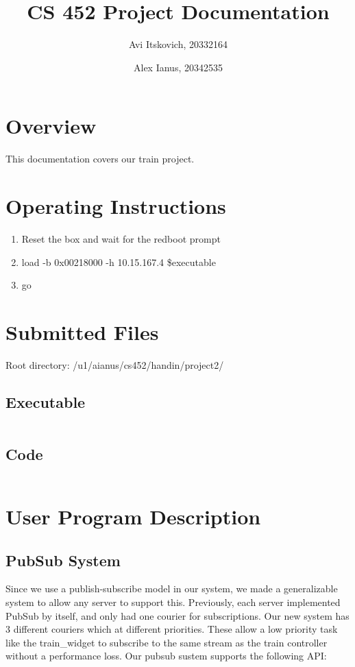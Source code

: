 \documentclass{article}
\title{CS 452 Project Documentation}
\author{
  Avi Itskovich, 20332164
  \and
  Alex Ianus, 20342535
}
\begin{document}
\maketitle

\section{Overview}

This documentation covers our train project.

\section{Operating Instructions}
\begin{enumerate}
  \item Reset the box and wait for the redboot prompt
  \item load -b 0x00218000 -h 10.15.167.4 \$executable
  \item go
\end{enumerate}

\section{Submitted Files}
Root directory: /u1/aianus/cs452/handin/project2/

\subsection{Executable}
\begin{verbatim}

\end{verbatim}

\subsection{Code}
\begin{verbatim}

\end{verbatim}

\section{User Program Description}

\subsection{PubSub System}

Since we use a publish-subscribe model in our system, we made a generalizable system to allow any server to support this. Previously, each server implemented PubSub by itself, and only had one courier for subscriptions. Our new system has 3 different couriers which at different priorities. These allow a low priority task like the train\_widget to subscribe to the same stream as the train controller without a performance loss. Our pubsub sustem supports the following API:
\end{document}
